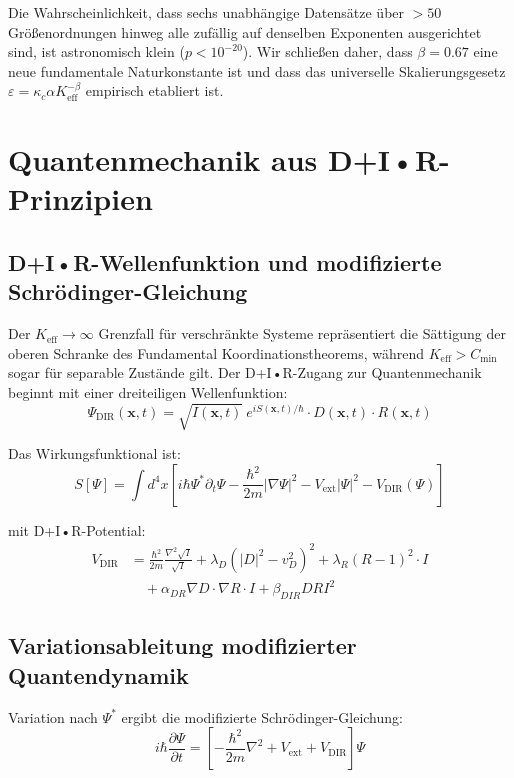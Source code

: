 \documentclass[11pt,a4paper]{article}
\begin{document}
	Die Wahrscheinlichkeit, dass sechs unabhängige Datensätze über \(>50\) Größenordnungen hinweg alle zufällig auf denselben Exponenten ausgerichtet sind, ist astronomisch klein (\(p < 10^{-20}\)). Wir schließen daher, dass \(\beta = 0.67\) eine neue fundamentale Naturkonstante ist und dass das universelle Skalierungsgesetz \(\varepsilon = \kappa_c \alpha K_{\mathrm{eff}}^{-\beta}\) empirisch etabliert ist.
	
	\section{Quantenmechanik aus D+I•R-Prinzipien}
	\subsection{D+I•R-Wellenfunktion und modifizierte Schrödinger-Gleichung}
	Der $K_{\mathrm{eff}} \to \infty$ Grenzfall für verschränkte Systeme repräsentiert die Sättigung der oberen Schranke des Fundamental Koordinationstheorems, während $K_{\mathrm{eff}} > C_{\min}$ sogar für separable Zustände gilt.
	Der D+I•R-Zugang zur Quantenmechanik beginnt mit einer dreiteiligen Wellenfunktion:
	\begin{equation}
		\Psi_{\text{DIR}}(\mathbf{x},t) = \sqrt{I(\mathbf{x},t)} \ e^{iS(\mathbf{x},t)/\hbar} \cdot D(\mathbf{x},t) \cdot R(\mathbf{x},t)
	\end{equation}
	
	Das Wirkungsfunktional ist:
	\begin{equation}
		S[\Psi] = \int d^4x \left[ i\hbar \Psi^* \partial_t \Psi - \frac{\hbar^2}{2m} |\nabla \Psi|^2 - V_{\text{ext}} |\Psi|^2 - V_{\text{DIR}}(\Psi) \right]
	\end{equation}
	
	mit D+I•R-Potential:
	\begin{align}
		V_{\text{DIR}} &= \frac{\hbar^2}{2m} \frac{\nabla^2 \sqrt{I}}{\sqrt{I}} 
		+ \lambda_D (|D|^2 - v_D^2)^2 
		+ \lambda_R (R - 1)^2 \cdot I \\
		&\quad + \alpha_{DR} \nabla D \cdot \nabla R \cdot I 
		+ \beta_{DIR} D R I^2
	\end{align}
	
	\subsection{Variationsableitung modifizierter Quantendynamik}
	
	Variation nach $\Psi^*$ ergibt die modifizierte Schrödinger-Gleichung:
	\begin{equation}
		i\hbar \frac{\partial \Psi}{\partial t} = \left[ -\frac{\hbar^2}{2m} \nabla^2 + V_{\text{ext}} + V_{\text{DIR}} \right] \Psi
	\end{equation}
	
\end{document}
